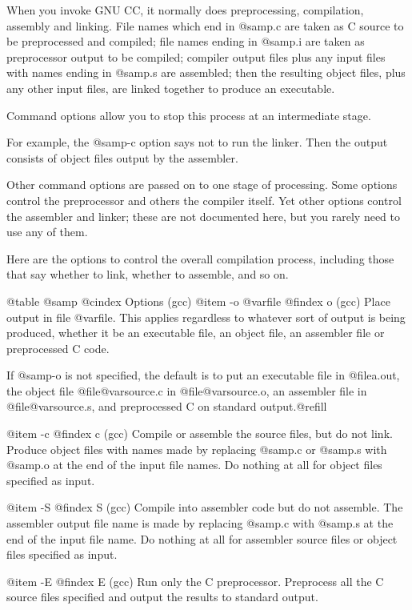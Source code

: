 {When you invoke GNU CC, it normally does preprocessing, compilation,
assembly and linking. File names which end in @samp{.c} are taken as C
source to be preprocessed and compiled; file names ending in @samp{.i}
are taken as preprocessor output to be compiled; compiler output files
plus any input files with names ending in @samp{.s} are assembled; then
the resulting object files, plus any other input files, are linked
together to produce an executable.

Command options allow you to stop this process at an intermediate stage.

For example, the @samp{-c} option says not to run the linker. Then the
output consists of object files output by the assembler.

Other command options are passed on to one stage of processing. Some
options control the preprocessor and others the compiler itself. Yet
other options control the assembler and linker; these are not documented
here, but you rarely need to use any of them.

Here are the options to control the overall compilation process, including
those that say whether to link, whether to assemble, and so on.

@table @samp
@cindex Options (gcc)
@item -o @var{file}
@findex o (gcc)
Place output in file @var{file}. This applies regardless to whatever
sort of output is being produced, whether it be an executable file,
an object file, an assembler file or preprocessed C code.

If @samp{-o} is not specified, the default is to put an executable file
in @file{a.out}, the object file @file{@var{source}.c} in
@file{@var{source}.o}, an assembler file in @file{@var{source}.s}, and
preprocessed C on standard output.@refill

@item -c
@findex c (gcc)
Compile or assemble the source files, but do not link. Produce object
files with names made by replacing @samp{.c} or @samp{.s} with
@samp{.o} at the end of the input file names. Do nothing at all for
object files specified as input.

@item -S
@findex S (gcc)
Compile into assembler code but do not assemble. The assembler output
file name is made by replacing @samp{.c} with @samp{.s} at the end of
the input file name.  Do nothing at all for assembler source files or
object files specified as input.

@item -E
@findex E (gcc)
Run only the C preprocessor. Preprocess all the C source files
specified and output the results to standard output.

}
